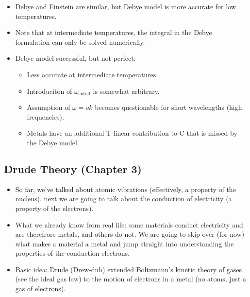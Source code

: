 \begin{itemize}
    \item Debye and Einstein are similar, but Debye model is more accurate for low temperatures.
    
    \item Note that at intermediate temperatures, the integral in the Debye formulation can only be solved numerically.
    
    \item Debye model  successful, but not perfect:
    \begin{itemize}
        \item Less accurate at intermediate temperatures.
        \item Introduciton of $\omega_{\text{cutoff}}$ is somewhat arbitrary.
        \item Assumption of $\omega=vk$ becomes questionable for short wavelengths (high frequencies).
        \item Metals have an additional T-linear contribution to C that is missed by the Debye model.
    \end{itemize}
    
\end{itemize}


\subsection{Drude Theory (Chapter 3)}

\begin{itemize}
    \item So far, we've talked about atomic vibrations (effectively, a property of the nucleus). next we are going to talk about the conduction of electricity (a property of the electrons).
    \item What we already know from real life: some materials conduct electricity and are therefrore metals, and others do not. We are going to skip over (for now) what makes a material a metal and jump straight into understanding the properties of the conduction electrons.
    \item Basic idea: Drude (Drew-duh) extended Boltzmann's kinetic theory of gases (see the ideal gas law) to the motion of electrons in a metal (no atoms, just a gas of electrons).
\end{itemize}


